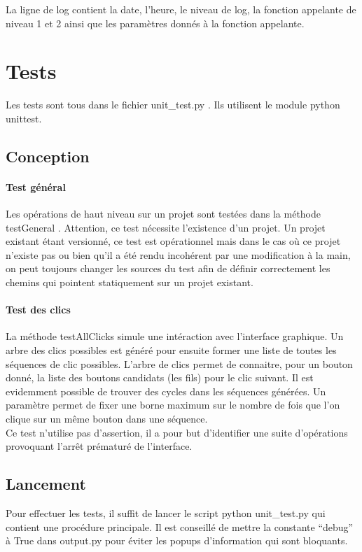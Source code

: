 \documentclass[12pt,a4paper]{article}
\begin{document}
        La ligne de log contient la date, l'heure, le niveau de log, la fonction appelante de niveau 1 et 2 ainsi que les paramètres
        donnés à la fonction appelante. 




\section{Tests}
    Les tests sont tous dans le fichier unit\_test.py . Ils utilisent le module
    python unittest.
    \subsection{Conception}
    \paragraph{Test général}
    Les opérations de haut niveau sur un projet sont testées dans la méthode
    testGeneral . Attention, ce test nécessite l'existence d'un projet. 
    Un projet existant étant versionné, ce test est opérationnel mais dans le
    cas où ce projet n'existe pas ou bien qu'il a été rendu incohérent par une
    modification à la main, on peut toujours changer les sources du test afin de
    définir correctement les chemins qui pointent statiquement sur un projet
    existant.
    \paragraph{Test des clics}
    La méthode testAllClicks simule une intéraction avec l'interface graphique.
    Un arbre des clics possibles est généré pour ensuite former une liste de
    toutes les séquences de clic possibles. L'arbre de clics permet de
    connaitre, pour un bouton donné, la liste des boutons candidats (les fils)
    pour le clic suivant. Il est evidemment possible de trouver des cycles dans
    les séquences générées. Un paramètre permet de fixer une borne maximum sur
    le nombre de fois que l'on clique sur un même bouton dans une séquence. \\

    Ce test n'utilise pas d'assertion, il a pour but d'identifier une suite
    d'opérations provoquant l'arrêt prématuré de l'interface.

    \subsection{Lancement}
    Pour effectuer les tests, il suffit de lancer le script python unit\_test.py
    qui contient une procédure principale. Il est conseillé de mettre la
    constante ``debug'' à True dans output.py pour éviter les popups
    d'information qui sont bloquants.\\
\end{document}
